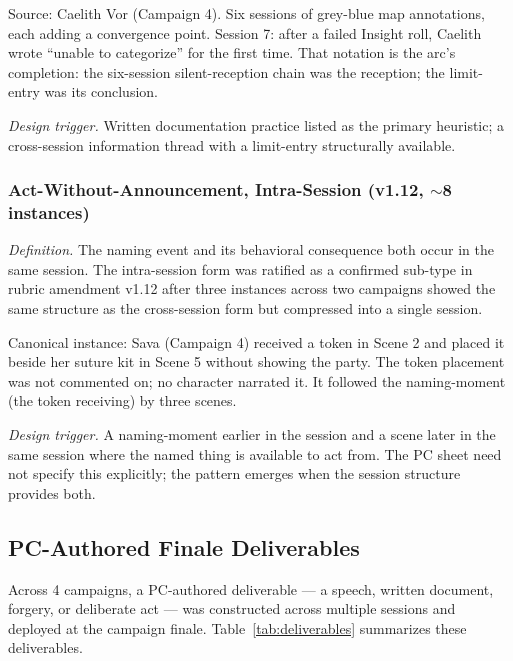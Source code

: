 Source: Caelith Vor (Campaign 4). Six sessions of grey-blue map annotations, each
adding a convergence point. Session 7: after a failed Insight roll, Caelith wrote
``unable to categorize'' for the first time. That notation is the arc's completion:
the six-session silent-reception chain was the reception; the limit-entry was its
conclusion.

\textit{Design trigger.} Written documentation practice listed as the primary heuristic;
a cross-session information thread with a limit-entry structurally available.

\subsubsection{Act-Without-Announcement, Intra-Session (v1.12, $\sim$8 instances)}

\textit{Definition.} The naming event and its behavioral consequence both occur in the
same session. The intra-session form was ratified as a confirmed sub-type in rubric
amendment v1.12 after three instances across two campaigns showed the same structure
as the cross-session form but compressed into a single session.

Canonical instance: Sava (Campaign 4) received a token in Scene 2 and placed it
beside her suture kit in Scene 5 without showing the party. The token placement was
not commented on; no character narrated it. It followed the naming-moment (the token
receiving) by three scenes.

\textit{Design trigger.} A naming-moment earlier in the session and a scene later in
the same session where the named thing is available to act from. The PC sheet need not
specify this explicitly; the pattern emerges when the session structure provides both.

\subsection{PC-Authored Finale Deliverables}

Across 4 campaigns, a PC-authored deliverable --- a speech, written document, forgery,
or deliberate act --- was constructed across multiple sessions and deployed at the
campaign finale. Table~\ref{tab:deliverables} summarizes these deliverables.

